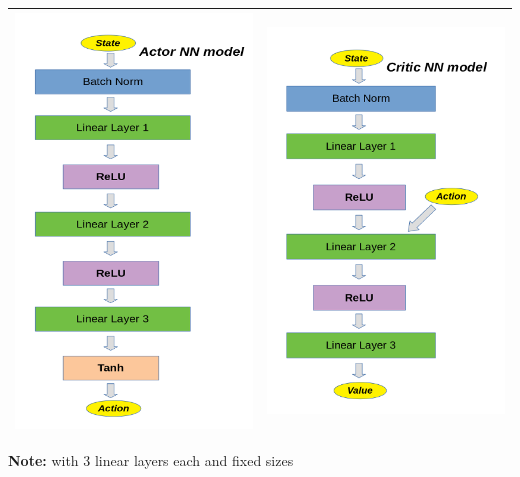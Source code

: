 \documentclass[a4paper]{article}
\begin{document}
\begin{tabular}{ |c|c| }
  \hline
  \includegraphics[scale=0.3]{ActorPic.png} & \includegraphics[scale=0.3]{CriticPic.png} \\
  \hline
\end{tabular}

\textbf{Note:} with 3 linear layers each and fixed sizes
\end{document}
